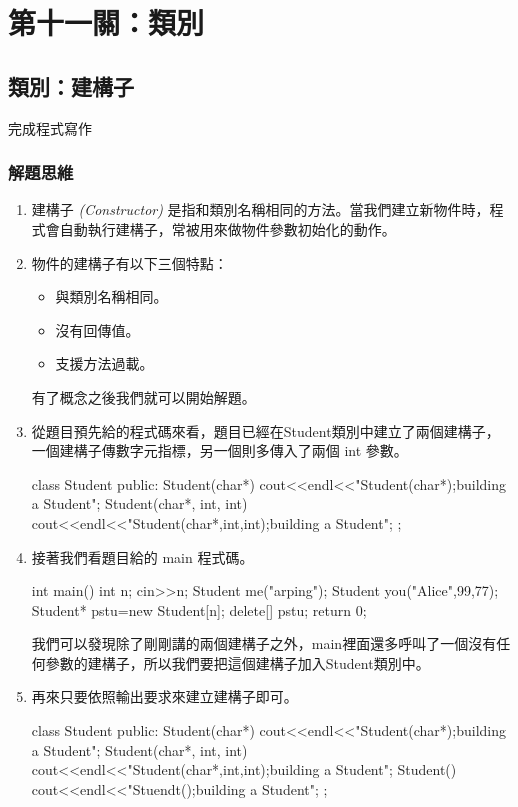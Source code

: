 \chapter{第十一關：類別}

\section{類別：建構子}
完成程式寫作

\subsection{解題思維}
\begin{enumerate}
	\item 建構子 \emph{(Constructor)} 是指和類別名稱相同的方法。當我們建立新物件時，程式會自動執行建構子，常被用來做物件參數初始化的動作。
	
	\item 物件的建構子有以下三個特點：
	\begin{itemize}
		\item 與類別名稱相同。
		\item 沒有回傳值。
		\item 支援方法過載。
	\end{itemize}
	有了概念之後我們就可以開始解題。
	
	\item 從題目預先給的程式碼來看，題目已經在Student類別中建立了兩個建構子，一個建構子傳數字元指標，另一個則多傳入了兩個 int 參數。
	\begin{inside}
	class Student{
		public:
		Student(char*){
			cout<<endl<<"Student(char*);building a Student";
		}
		Student(char*, int, int) {
			cout<<endl<<"Student(char*,int,int);building a Student";
		}
	};
	\end{inside}
	\item 接著我們看題目給的 main 程式碼。
	\begin{inside}
	int main(){
		int n;
		cin>>n;
		Student me("arping");
		Student you("Alice",99,77);
		Student* pstu=new Student[n];
		delete[] pstu;
		return 0;
	}		
	\end{inside}
	我們可以發現除了剛剛講的兩個建構子之外，main裡面還多呼叫了一個沒有任何參數的建構子，所以我們要把這個建構子加入Student類別中。
	\item 再來只要依照輸出要求來建立建構子即可。
	\begin{inside}
	class Student{
		public:
		Student(char*){
			cout<<endl<<"Student(char*);building a Student";
		}
		Student(char*, int, int) {
			cout<<endl<<"Student(char*,int,int);building a Student";
		}
		Student() {
			cout<<endl<<"Stuendt();building a Student";
		}
	};
	\end{inside}
\end{enumerate}


